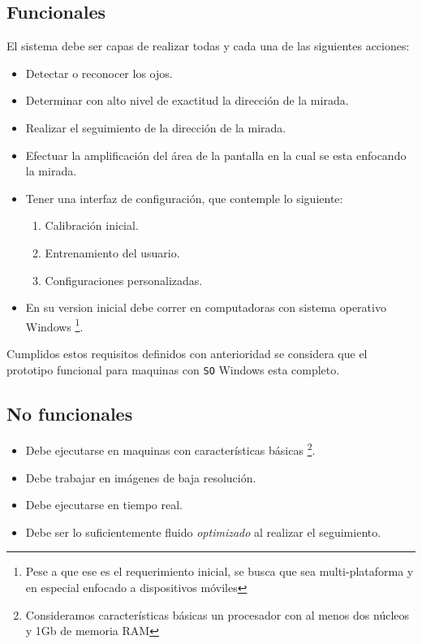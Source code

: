 \documentclass[12pt]{article} %
\begin{document}
	\subsection{Funcionales}
    	El sistema debe ser capas de realizar todas y cada una de las siguientes acciones:
        \begin{itemize}
        	\item Detectar o reconocer los ojos.
            \item Determinar con alto nivel de exactitud la dirección de la mirada.
			\item Realizar el seguimiento de la dirección de la mirada.
            \item Efectuar la amplificación del área de la pantalla en la cual se esta enfocando la mirada.
            \item Tener una interfaz de configuración, que contemple lo siguiente:
            	\begin{enumerate}
                	\item Calibración inicial.
					\item Entrenamiento del usuario.
                    \item Configuraciones personalizadas.
				\end{enumerate}
            \item En su version inicial debe correr en computadoras con sistema operativo Windows 
            \footnote{\scriptsize Pese a que ese es el requerimiento inicial, se busca que sea multi-plataforma y en especial enfocado a
            dispositivos móviles}.
		\end{itemize}
       
       Cumplidos estos requisitos definidos con anterioridad se considera que el prototipo funcional para maquinas con \texttt{SO} Windows esta
       completo.
       
	\subsection{No funcionales}
    	
    	\begin{itemize}
        	\item Debe ejecutarse en maquinas con características básicas \footnote{\scriptsize Consideramos características básicas un
            procesador con al menos dos núcleos y 1Gb de memoria RAM}.
			\item Debe trabajar en imágenes de baja resolución.
            \item Debe ejecutarse en tiempo real.
            \item Debe ser lo suficientemente fluido \textit{optimizado} al realizar el seguimiento.
		\end{itemize}
        
\end{document}
